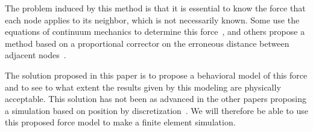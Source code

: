 The problem induced by this method is that it is essential to know the force that each node applies to its neighbor, which is not necessarily known. Some use the equations of continuum mechanics to determine this force~\cite{koenemann_modeling_2017, prabhakar_dynamics_2005}, and others propose a method based on a proportional corrector on the erroneous distance between adjacent nodes~\cite{ellis_modeling,ganoni_unreal,blintsov_development_2017}.

The solution proposed in this paper is to propose a behavioral model of this force and to see to what extent the results given by this modeling are physically acceptable. This solution has not been as advanced in the other papers proposing a simulation based on position by discretization~\cite{ganoni_unreal,blintsov_development_2017}. We will therefore be able to use this proposed force model to make a finite element simulation.